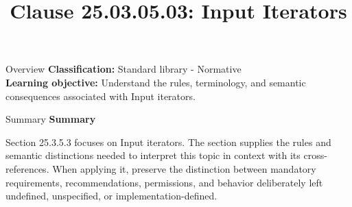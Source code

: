 \documentclass[10pt,letterpaper]{article}
\title{Clause 25.03.05.03: Input Iterators}
\author{}
\date{}
\begin{document}
\maketitle
\begin{CornellOverviewBox}{Overview}
\textbf{Classification:} Standard library - Normative\\[2pt]
\textbf{Learning objective:} Understand the rules, terminology, and semantic consequences associated with Input iterators.
\end{CornellOverviewBox}\begin{CornellSummaryBox}{Summary}
{\sffamily\bfseries\color{Accent} Summary}\par\vspace{3pt}Section 25.3.5.3 focuses on Input iterators. The section supplies the rules and semantic distinctions needed to interpret this topic in context with its cross-references. When applying it, preserve the distinction between mandatory requirements, recommendations, permissions, and behavior deliberately left undefined, unspecified, or implementation-defined.
\end{CornellSummaryBox}
\end{document}

